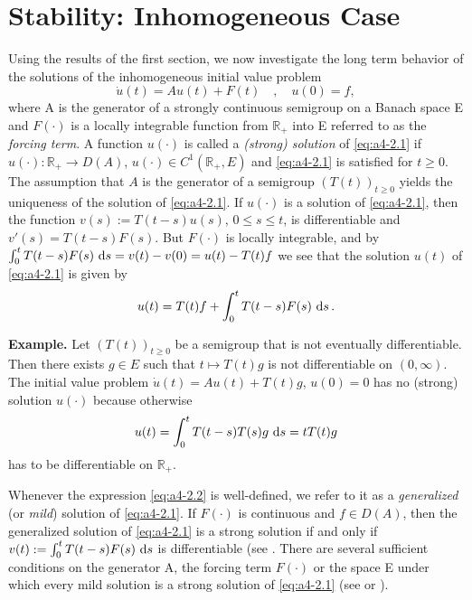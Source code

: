 \section{Stability: Inhomogeneous Case}
Using the results of the first section, we now investigate the long
term behavior of the solutions of the inhomogeneous initial value
problem
\begin{equation}\label{eq:a4-2.1}
\dot{u}(t) = Au(t) + F(t) \quad , \quad u(0) = f,
\end{equation}
where A is the generator of a strongly continuous semigroup on a
Banach space E and $F(\cdot)$ is a locally integrable function from $\mathbb{R}_{+}$
into E referred to as the \emph{forcing term}. 
A function $u(\cdot)$ is called a \emph{(strong) solution} of \eqref{eq:a4-2.1} if $u(\cdot) \colon \mathbb{R}_{+} \to D(A)$, 
$u(\cdot) \in C^{1}(\mathbb{R}_{+},E)$ and \eqref{eq:a4-2.1} is satisfied for $t \geq 0$.
The assumption that $A$ is the generator of a semigroup $(T(t))_{t \geq 0}$
yields the uniqueness of the solution of \eqref{eq:a4-2.1}. 
If $u(\cdot)$ is a solution of \eqref{eq:a4-2.1}, then the function $v(s) := T(t-s)u(s)$, $0 \leq s \leq t$, is
differentiable and $v'(s) = T(t-s)F(s)$. 
But $F(\cdot)$ is locally integrable, and by $\int_{0}^{t} T(t-s)F(s) \,\mathop{}\!\mathrm{d}{s} = v(t) - v(0) = u(t) - T(t)f$ we see
that the solution $u(t)$ of \eqref{eq:a4-2.1} is given by
\begin{equation}\label{eq:a4-2.2}
u(t) = T(t)f + \int_{0}^{t} T(t-s)F(s) \,\mathop{}\!\mathrm{d}{s}\,.
\end{equation}


{\bf Example.} \label{ex:a4-2.1}
Let $(T(t))_{t \geq 0}$ be a semigroup that is not eventually differentiable. 
Then there
exists $g \in E$ such that $t \mapsto T(t)g$ is not differentiable on $(0,\infty)$.
The initial value problem $\dot{u}(t) = Au(t) + T(t)g$, $u(0) = 0$ has no
(strong) solution $u(\cdot)$ because otherwise
\begin{align*}
u(t) = \int_{0}^{t} T(t-s)T(s)g \,\mathop{}\!\mathrm{d}{s} = tT(t)g
\end{align*}
has to be differentiable on $\mathbb{R}_{+}$.


Whenever the expression \eqref{eq:a4-2.2} is well-defined, we refer to it as a  \emph{generalized} (or
\emph{mild}) solution of \eqref{eq:a4-2.1}. 
If $F(\cdot)$ is continuous and $f \in D(A)$, then
the generalized solution of \eqref{eq:a4-2.1} is a strong solution if and only if
$v(t) := \int_{0}^{t} T(t-s)F(s) \,\mathop{}\!\mathrm{d}{s}$ is differentiable (see \citet[Chapter~4,2.4]{pazy:1983}. 
There are several sufficient conditions on the generator A,
the forcing term $F(\cdot)$ or the space E under which every mild solution
is a strong solution of \eqref{eq:a4-2.1} (see \citet{travis:1979}
or  \citet[Section~4.2]{pazy:1983}).


